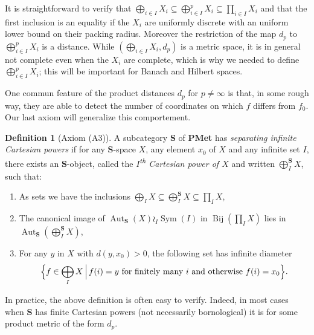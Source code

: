 \documentclass[a4paper]{article}
\theoremstyle{definition}
\newtheorem{defn}[lem]{Definition}
\DeclareMathOperator\Sym{Sym}
\DeclareMathOperator\Aut{Aut}
\DeclareMathOperator\Bij{Bij}
\newcommand*{\category}[1]{\textbf{#1}}
\newcommand*{\PMet}{\category{PMet}}
\newcommand*{\CatS}{\category{S}}
\newcommand{\setst}[2]{\{#1\ |\ #2\}}
\begin{document}
It is straightforward to verify that $\bigoplus_{i\in I} X_i\subseteq\bigoplus_{i\in I}^p X_i\subseteq\prod_{i\in I}X_i$ and that the first inclusion is an equality if the $X_i$ are uniformly discrete with an uniform lower bound on their packing radius.
Moreover the restriction of the map $d_p$ to $\bigoplus_{i\in I}^p X_i$ is a distance.
While $(\bigoplus_{i\in I} X_i, d_p)$ is a metric space, it is in general not complete even when the $X_i$ are complete, which is why we needed to define $\bigoplus_{i\in I}^p X_i$; this will be important for Banach and Hilbert spaces.

One commun feature of the product distances $d_p$ for $p\neq\infty$ is that, in some rough way, they are able to detect the number of coordinates on which $f$ differs from $f_0$.
Our last axiom will generalize this comportement.
%
%
\begin{defn}[Axiom (A3)]\label{Def:InfiniteCartesian}
A subcategory \CatS{} of \PMet{} has \emph{separating infinite Cartesian powers} if for any \CatS-space $X$, any element $x_0$ of $X$ and any infinite set $I$, there exists an \CatS-object, called the \emph{$I$\textsuperscript{th} Cartesian power of $X$} and written $\bigoplus_I ^\CatS X$, such that:
\begin{enumerate}
\item
As sets we have the inclusions $\bigoplus_I X\subseteq \bigoplus_I^\CatS X\subseteq \prod_I X$,
\item
The canonical image of $\Aut_{\CatS}(X)\wr_I \Sym(I)$ in $\Bij(\prod_I X)$ lies in $\Aut_{\CatS}(\bigoplus_I^\CatS X)$,
\item
For any $y$ in $X$ with $d(y,x_0)>0$, the following set has infinite diameter
\[
	\Bigl\{f\in \bigoplus_I X\,\Big|\,f(i)=y \textnormal{ for finitely many } i \textnormal{ and otherwise }f(i)=x_0\Bigr\}.
\]
\end{enumerate}
\end{defn}
%
%
In practice, the above definition is often easy to verify.
Indeed, in most cases when \CatS{} has finite Cartesian powers (not necessarily bornological) it is for some product metric of the form $d_p$.
\end{document}

